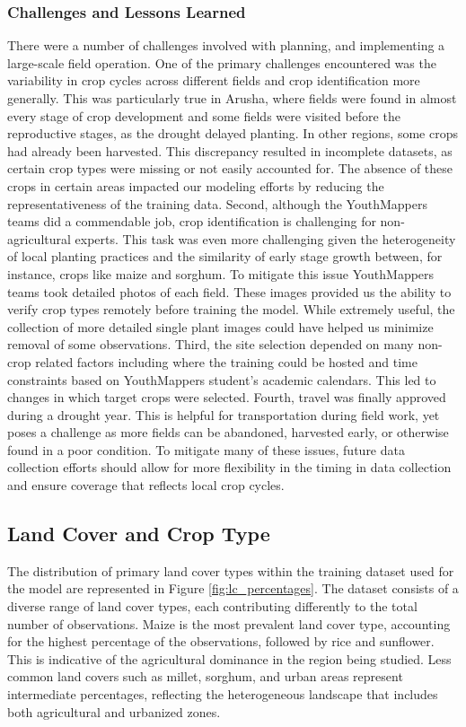 \documentclass[journal]{IEEEtran}
\begin{document}
\subsubsection{Challenges and Lessons Learned}

There were a number of challenges involved with planning, and implementing a large-scale field operation. One of the primary challenges encountered was the variability in crop cycles across different fields and crop identification more generally. This was particularly true in Arusha, where fields were found in almost every stage of crop development and some fields were visited before the reproductive stages, as the drought delayed planting. In other regions, some crops had already been harvested. This discrepancy resulted in incomplete datasets, as certain crop types were missing or not easily accounted for. The absence of these crops in certain areas impacted our modeling efforts by reducing the representativeness of the training data. Second, although the YouthMappers teams did a commendable job, crop identification is challenging for non-agricultural experts. This task was even more challenging given the heterogeneity of local planting practices and the similarity of early stage growth between, for instance, crops like maize and sorghum. To mitigate this issue YouthMappers teams took detailed photos of each field. These images provided us the ability to verify crop types remotely before training the model. While extremely useful, the collection of more detailed single plant images could have helped us minimize removal of some observations. Third, the site selection depended on many non-crop related factors including where the training could be hosted and time constraints based on YouthMappers student’s academic calendars. This led to changes in which target crops were selected. Fourth, travel was finally approved during a drought year. This is helpful for transportation during field work, yet poses a challenge as more fields can be abandoned, harvested early, or otherwise found in a poor condition. To mitigate many of these issues, future data collection efforts should allow for more flexibility in the timing in data collection and ensure coverage that reflects local crop cycles.

\subsection{Land Cover and Crop Type}

The distribution of primary land cover types within the training dataset used for the model are represented in Figure \ref{fig:lc_percentages}. The dataset consists of a diverse range of land cover types, each contributing differently to the total number of observations. Maize is the most prevalent land cover type, accounting for the highest percentage of the observations, followed by rice and sunflower. This is indicative of the agricultural dominance in the region being studied. Less common land covers such as millet, sorghum, and urban areas represent intermediate percentages, reflecting the  heterogeneous landscape that includes both agricultural and urbanized zones.
\end{document}
